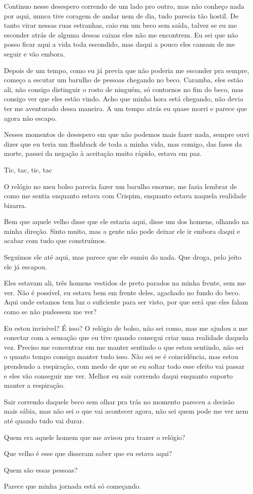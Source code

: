 Continuo nesse desespero correndo de um lado pro outro, mas não conheço nada por aqui, nunca tive coragem de andar nem de dia, tudo parecia tão hostil. De tanto virar nessas ruas estranhas, caio em um beco sem saída, talvez se eu me esconder atrás de alguma dessas caixas eles não me encontrem. Eu sei que não posso ficar aqui a vida toda escondido, mas daqui a pouco eles cansam de me seguir e vão embora.

Depois de um tempo, como eu já previa que não poderia me esconder pra sempre, começo a escutar um barulho de pessoas chegando no beco. Caramba, eles estão ali, não consigo distinguir o rosto de ninguém, só contornos no fim do beco, mas consigo ver que eles estão vindo. Acho que minha hora está chegando, não devia ter me aventurado dessa maneira. A um tempo atrás eu quase morri e parece que agora não escapo.

Nesses momentos de desespero em que não podemos mais fazer nada, sempre ouvi dizer que eu teria um flashback de toda a minha vida, mas comigo, das fases da morte, passei da negação à aceitação muito rápido, estava em paz.

Tic, tac, tic, tac

O relógio no meu bolso parecia fazer um barulho enorme, me fazia lembrar de como me sentia enquanto estava com Crispim, enquanto estava naquela realidade bizarra.

Bem que aquele velho disse que ele estaria aqui, disse um dos homens, olhando na minha direção. Sinto muito, mas a gente não pode deixar ele ir embora daqui e acabar com tudo que construímos.

Seguimos ele até aqui, mas parece que ele sumiu do nada. Que droga, pelo jeito ele já escapou.

Eles estavam ali, três homens vestidos de preto parados na minha frente, sem me ver. Não é possível, eu estava bem em frente deles, agachado no fundo do beco. Aqui onde estamos tem luz o suficiente para ser visto, por que será que eles falam como se não pudessem me ver?

Eu estou invisível? É isso? O relógio de bolso, não sei como, mas me ajudou a me conectar com a sensação que eu tive quando consegui criar uma realidade daquela vez. Preciso me concentrar em me manter sentindo o que estou sentindo, não sei o quanto tempo consigo manter tudo isso. Não sei se é coincidência, mas estou prendendo a respiração, com medo de que se eu soltar todo esse efeito vai passar e eles vão conseguir me ver. Melhor eu sair correndo daqui enquanto suporto manter a respiração.

Sair correndo daquele beco sem olhar pra trás no momento pareceu a decisão mais sábia, mas não sei o que vai acontecer agora, não sei quem pode me ver nem até quando tudo vai durar.

Quem era aquele homem que me avisou pra trazer o relógio?

Que velho é esse que disseram saber que eu estava aqui?

Quem são essas pessoas?

Parece que minha jornada está só começando.




